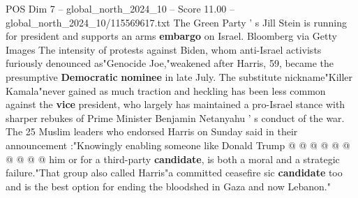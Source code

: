 \begin{textsample}{POS Dim 7 – global\_north\_2024\_10 – Score 11.00 – global\_north\_2024\_10/115569617.txt}
The Green Party ' s Jill Stein is running for president and supports an arms \textbf{embargo} on Israel.
Bloomberg via Getty Images The intensity of protests against Biden, whom anti-Israel activists furiously denounced as"Genocide Joe,"weakened after Harris, 59, became the presumptive \textbf{Democratic} \textbf{nominee} in late July.
The substitute nickname"Killer Kamala"never gained as much traction and heckling has been less common against the \textbf{vice} president, who largely has maintained a pro-Israel stance with sharper rebukes of Prime Minister Benjamin Netanyahu ' s conduct of the war.
The 25 Muslim leaders who endorsed Harris on Sunday said in their announcement :"Knowingly enabling someone like Donald Trump @ @ @ @ @ @ @ @ @ @ him or for a third-party \textbf{candidate}, is both a moral and a strategic failure."That group also called Harris"a committed ceasefire sic \textbf{candidate} too and is the best option for ending the bloodshed in Gaza and now Lebanon."

\end{textsample}
